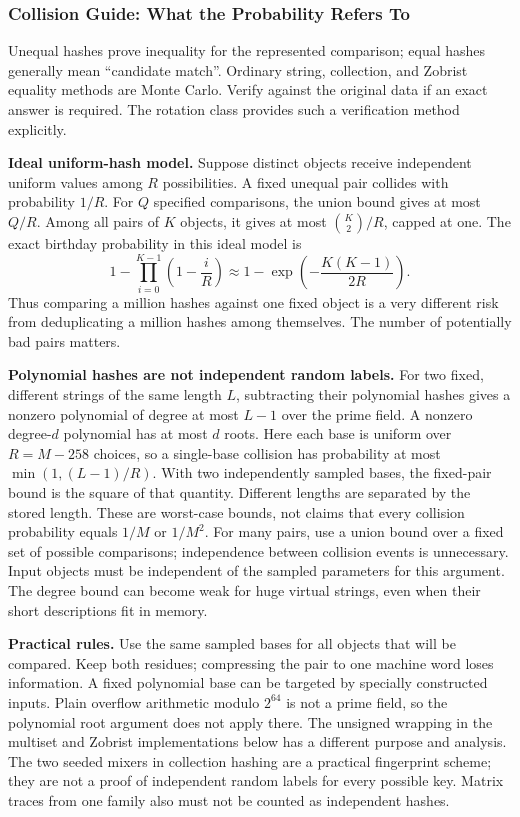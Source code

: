 \subsubsection{Collision Guide: What the Probability Refers To}
Unequal hashes prove inequality for the represented comparison;
equal hashes generally mean ``candidate match''. Ordinary string,
collection, and Zobrist equality methods are Monte Carlo. Verify
against the original data if an exact answer is required.
The rotation class provides such a verification method explicitly.

\textbf{Ideal uniform-hash model.} Suppose distinct objects receive
independent uniform values among $R$ possibilities. A fixed unequal
pair collides with probability $1/R$. For $Q$ specified comparisons,
the union bound gives at most $Q/R$. Among all pairs of $K$ objects,
it gives at most $\binom K2/R$, capped at one.
The exact birthday probability in this ideal model is
\[
 1-\prod_{i=0}^{K-1}\left(1-\frac{i}{R}\right)
 \approx 1-\exp\left(-\frac{K(K-1)}{2R}\right).
\]
Thus comparing a million hashes against one fixed object is a
very different risk from deduplicating a million hashes among
themselves. The number of potentially bad pairs matters.

\textbf{Polynomial hashes are not independent random labels.}
For two fixed, different strings of the same length $L$, subtracting
their polynomial hashes gives a nonzero polynomial of degree at most
$L-1$ over the prime field. A nonzero degree-$d$ polynomial has at most
$d$ roots. Here each base is uniform over $R=M-258$ choices, so a
single-base collision has probability at most
$\min(1,(L-1)/R)$. With two independently sampled bases, the fixed-pair
bound is the square of that quantity. Different lengths are
separated by the stored length. These are worst-case bounds, not
claims that every collision probability equals $1/M$ or $1/M^2$.
For many pairs, use a union bound over a fixed set of possible
comparisons; independence between collision events is unnecessary.
Input objects must be independent of the sampled parameters for
this argument. The degree bound can become weak for huge virtual
strings, even when their short descriptions fit in memory.

\textbf{Practical rules.} Use the same sampled bases for all objects
that will be compared. Keep both residues; compressing the pair to
one machine word loses information. A fixed polynomial base can be
targeted by specially constructed inputs. Plain overflow arithmetic
modulo $2^{64}$ is not a prime field, so the polynomial root argument
does not apply there. The unsigned wrapping in the multiset and
Zobrist implementations below has a different purpose and analysis.
The two seeded mixers in collection hashing are a practical
fingerprint scheme; they are not a proof of independent random
labels for every possible key. Matrix traces from one family also
must not be counted as independent hashes.

